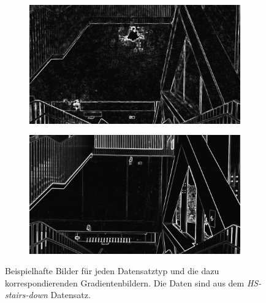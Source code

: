 \begin{figure}
\begin{subfigure}[t]{0.24\linewidth}
		\caption{}
	\end{subfigure}
	\hfill
	\begin{subfigure}[t]{0.24\linewidth}
		\centering
		\includegraphics[width=\linewidth]{images/syn_dataset/cg00188.png}
		\caption{}
	\end{subfigure}
	\hfill
	\begin{subfigure}[t]{0.24\linewidth}
		\centering
		\includegraphics[width=\linewidth]{images/syn_dataset/rg000089.png}
		\caption{}
	\end{subfigure}
	\hfill
	\caption{Beispielhafte Bilder für jeden Datensatztyp und die dazu korrespondierenden Gradientenbildern. Die Daten sind aus dem \textit{HS-stairs-down} Datensatz.}
	\label{fig:dataset_preprocess}
\end{figure}

